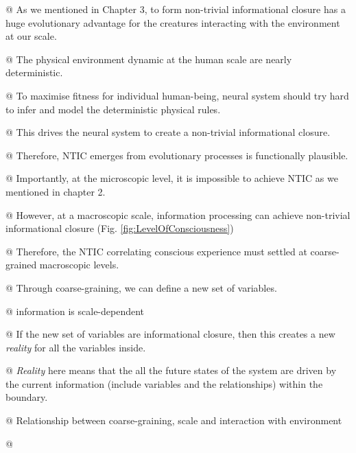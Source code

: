 \documentclass[utf8]{article}
\begin{document}
		\begin{WritingMaterials}
    		
            @ As we mentioned in Chapter 3, to form non-trivial informational closure has a huge evolutionary advantage for the creatures interacting with the environment at our scale. 
            
            @ The physical environment dynamic at the human scale are nearly deterministic.
            
    		@ To maximise fitness for individual human-being, neural system should try hard to infer and model the deterministic physical rules.
    
    		@ This drives the neural system to create a non-trivial informational closure.
    		
            @ Therefore, NTIC emerges from evolutionary processes is functionally plausible. 
            
            @ Importantly, at the microscopic level, it is impossible to achieve NTIC as we mentioned in chapter 2.
    
    		@ However, at a macroscopic scale, information processing can achieve non-trivial informational closure (Fig. \ref{fig:LevelOfConsciousness})
            
            @ Therefore, the NTIC correlating conscious experience must settled at coarse-grained macroscopic levels.
            
    		@ Through coarse-graining, we can define a new set of variables.
    
            @ information is scale-dependent
            
    		@ If the new set of variables are informational closure, then this creates a new \textit{reality} for all the variables inside.   
    		
    		@ \textit{Reality} here means that the all the future states of the system are driven by the current information (include variables and the relationships) within the boundary. 
    			
            
            @ Relationship between coarse-graining, scale and interaction with environment
            
            
    		@  \cite{price2007causation}
    

\end{WritingMaterials}
\end{document}
